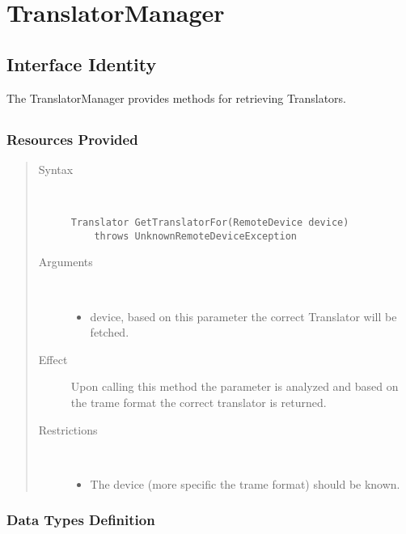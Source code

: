 \section{TranslatorManager}

\subsection{Interface Identity}

\npar The TranslatorManager provides methods for retrieving Translators.

\subsection{}

\subsubsection{Resources Provided}

\begin{quote}
	\begin{description}
		\item[Syntax] \
		\begin{verbatim}
Translator GetTranslatorFor(RemoteDevice device) 
    throws UnknownRemoteDeviceException
		\end{verbatim}
		\item[Arguments] \
		\begin{itemize}
		  \item device, based on this parameter the correct Translator will be
		  fetched.
		\end{itemize}
		\item[Effect] Upon calling this method the parameter is analyzed and based on
		the trame format the correct translator is returned.
		\item[Restrictions] \
		\begin{itemize}
		  \item The device (more specific the trame format) should be
			known.
		\end{itemize}
	\end{description} 
\end{quote}

\subsubsection{Data Types Definition}


